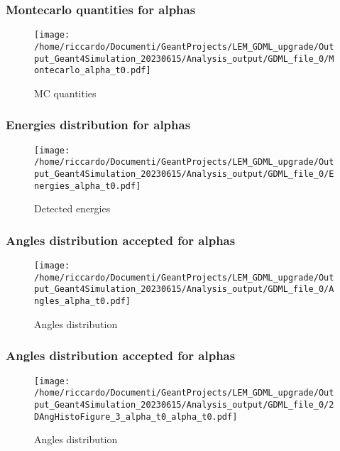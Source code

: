 \documentclass[8pt]{beamer}
\begin{document}
        \begin{frame}
            \frametitle{Montecarlo quantities for alphas}
        
        \begin{figure}[h]
            \centering
            \texttt{[image: /home/riccardo/Documenti/GeantProjects/LEM\_GDML\_upgrade/Output\_Geant4Simulation\_20230615/Analysis\_output/GDML\_file\_0/Montecarlo\_alpha\_t0.pdf]}
            \caption{MC quantities}
        \end{figure}
        
        \end{frame}
        
        \begin{frame}
            \frametitle{Energies distribution for alphas}
        
        \begin{figure}[h]
            \centering
            \texttt{[image: /home/riccardo/Documenti/GeantProjects/LEM\_GDML\_upgrade/Output\_Geant4Simulation\_20230615/Analysis\_output/GDML\_file\_0/Energies\_alpha\_t0.pdf]}
            \caption{Detected energies}
        \end{figure}
        
        \end{frame}
        
        \begin{frame}
            \frametitle{Angles distribution accepted for alphas}
        
        \begin{figure}[h]
            \centering
            \texttt{[image: /home/riccardo/Documenti/GeantProjects/LEM\_GDML\_upgrade/Output\_Geant4Simulation\_20230615/Analysis\_output/GDML\_file\_0/Angles\_alpha\_t0.pdf]}
            \caption{Angles distribution}
        \end{figure}
        
        \end{frame}
        
        \begin{frame}
            \frametitle{Angles distribution accepted for alphas}
        
        \begin{figure}[h]
            \centering
            \texttt{[image: /home/riccardo/Documenti/GeantProjects/LEM\_GDML\_upgrade/Output\_Geant4Simulation\_20230615/Analysis\_output/GDML\_file\_0/2DAngHistoFigure\_3\_alpha\_t0\_alpha\_t0.pdf]}
            \caption{Angles distribution}
        \end{figure}
        
        \end{frame}
        
\end{document}
